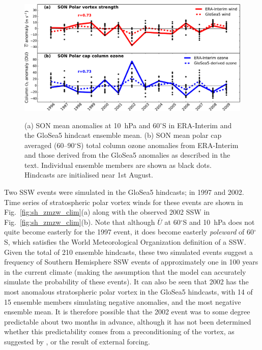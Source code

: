 \begin{figure}[t]
  \noindent\includegraphics[width=\textwidth,angle=0]{figures/chapter-seasonal/zmzw_ozone_crop.pdf}\\
  \caption[GloSea5 forecast skill for the stratospheric polar vortex strength
and column ozone.]{(a) SON mean anomalies at 10~hPa and 60$^{\circ}$S in
ERA-Interim and the GloSea5 hindcast ensemble mean. (b) SON mean polar cap
averaged (60--90$^{\circ}$S) total column ozone anomalies from ERA-Interim and
those derived from the GloSea5 anomalies as described in the text. Individual
ensemble members are shown as black dots. Hindcasts are initialised near 1st
August.}\label{fig:zmzw_ozone}
\end{figure}

Two SSW events were simulated in the GloSea5 hindcasts; in 1997 and 2002. Time
series of stratospheric polar vortex winds for these events are shown in Fig.\
\ref{fig:sh_zmzw_clim}(a) along with the observed 2002 SSW in Fig.\
\ref{fig:sh_zmzw_clim}(b). Note that although $\overline{U}$ at 60$^{\circ}$S
and 10~hPa does not quite become easterly for the 1997 event, it does become
easterly \emph{poleward} of 60$^{\circ}$S, which satisfies the World
Meteorological Organization definition of a SSW. Given the total of 210 ensemble
hindcasts, these two simulated events suggest a frequency of Southern Hemisphere
SSW events of approximately one in 100 years in the current climate (making the
assumption that the model can accurately simulate the probability of these
events). It can also be seen that 2002 has the most anomalous stratospheric
polar vortex in the GloSea5 hindcasts, with 14 of 15 ensemble members simulating
negative anomalies, and the most negative ensemble mean. It is therefore
possible that the 2002 event was to some degree predictable about two months in
advance, although it has not been determined whether this predictability comes
from a preconditioning of the vortex, as suggested by \citet{Scaife2005c}, or
the result of external forcing.

